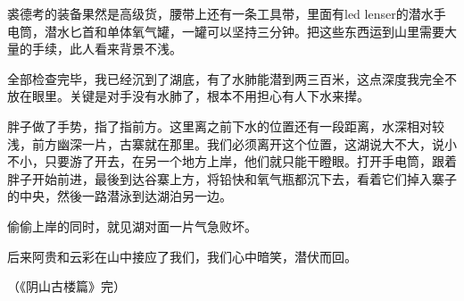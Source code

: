 裘德考的装备果然是高级货，腰带上还有一条工具带，里面有led lenser的潜水手电筒，潜水匕首和单体氧气罐，一罐可以坚持三分钟。把这些东西运到山里需要大量的手续，此人看来背景不浅。

全部检查完毕，我已经沉到了湖底，有了水肺能潜到两三百米，这点深度我完全不放在眼里。关键是对手没有水肺了，根本不用担心有人下水来撵。

胖子做了手势，指了指前方。这里离之前下水的位置还有一段距离，水深相对较浅，前方幽深一片，古寨就在那里。我们必须离开这个位置，这湖说大不大，说小不小，只要游了开去，在另一个地方上岸，他们就只能干瞪眼。打开手电筒，跟着胖子开始前进，最後到达谷寨上方，将铅快和氧气瓶都沉下去，看着它们掉入寨子的中央，然後一路潜泳到达湖泊另一边。

偷偷上岸的同时，就见湖对面一片气急败坏。

后来阿贵和云彩在山中接应了我们，我们心中暗笑，潜伏而回。

{\fzqiti\hfill （《阴山古楼篇》完）}